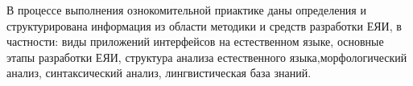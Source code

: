 
В процессе выполнения ознокомительной приактике даны определения и структурирована информация из области методики и средств разработки ЕЯИ, в частности: виды приложений интерфейсов на естественном языке, основные этапы разработки ЕЯИ, структура анализа естественного языка,морфологический анализ, синтаксический анализ, лингвистическая база знаний.

